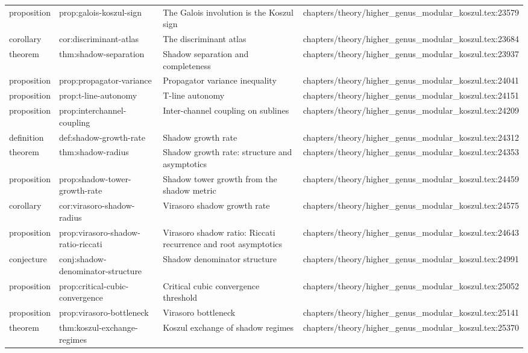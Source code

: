 \documentclass[11pt]{article}
\begin{document}
\begin{longtable}{L{0.10\textwidth}L{0.26\textwidth}L{0.42\textwidth}L{0.22\textwidth}}
proposition & prop:galois-koszul-sign & The Galois involution is the Koszul sign & chapters/theory/higher\_genus\_modular\_koszul.tex:23579\\
corollary & cor:discriminant-atlas & The discriminant atlas & chapters/theory/higher\_genus\_modular\_koszul.tex:23684\\
theorem & thm:shadow-separation & Shadow separation and completeness & chapters/theory/higher\_genus\_modular\_koszul.tex:23937\\
proposition & prop:propagator-variance & Propagator variance inequality & chapters/theory/higher\_genus\_modular\_koszul.tex:24041\\
proposition & prop:t-line-autonomy & T-line autonomy & chapters/theory/higher\_genus\_modular\_koszul.tex:24151\\
proposition & prop:interchannel-coupling & Inter-channel coupling on sublines & chapters/theory/higher\_genus\_modular\_koszul.tex:24209\\
definition & def:shadow-growth-rate & Shadow growth rate & chapters/theory/higher\_genus\_modular\_koszul.tex:24312\\
theorem & thm:shadow-radius & Shadow growth rate: structure and asymptotics & chapters/theory/higher\_genus\_modular\_koszul.tex:24353\\
proposition & prop:shadow-tower-growth-rate & Shadow tower growth from the shadow metric & chapters/theory/higher\_genus\_modular\_koszul.tex:24459\\
corollary & cor:virasoro-shadow-radius & Virasoro shadow growth rate & chapters/theory/higher\_genus\_modular\_koszul.tex:24575\\
proposition & prop:virasoro-shadow-ratio-riccati & Virasoro shadow ratio: Riccati recurrence and root asymptotics & chapters/theory/higher\_genus\_modular\_koszul.tex:24643\\
conjecture & conj:shadow-denominator-structure & Shadow denominator structure & chapters/theory/higher\_genus\_modular\_koszul.tex:24991\\
proposition & prop:critical-cubic-convergence & Critical cubic convergence threshold & chapters/theory/higher\_genus\_modular\_koszul.tex:25052\\
proposition & prop:virasoro-bottleneck & Virasoro bottleneck & chapters/theory/higher\_genus\_modular\_koszul.tex:25141\\
theorem & thm:koszul-exchange-regimes & Koszul exchange of shadow regimes & chapters/theory/higher\_genus\_modular\_koszul.tex:25370\\

\end{longtable}
\end{document}
